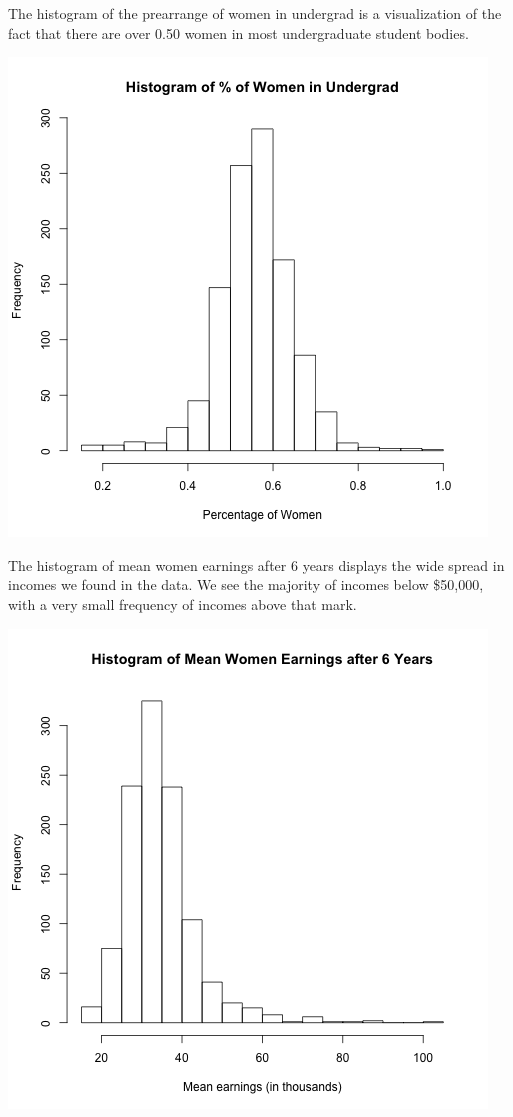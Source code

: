 \documentclass[11pt,english]{article}
\begin{document}
The histogram of the prearrange of women in undergrad is a visualization of the fact that there are over 0.50 women in most undergraduate student bodies.

\noindent\includegraphics{../images/hist-ugds-women.png}

The histogram of mean women earnings after 6 years displays the wide spread in incomes we found in the data. We see the majority of incomes below \$50,000, with a very small frequency of incomes above that mark.

\noindent\includegraphics [width=\linewidth]{../images/hist-mn-earn.png}
\end{document}
